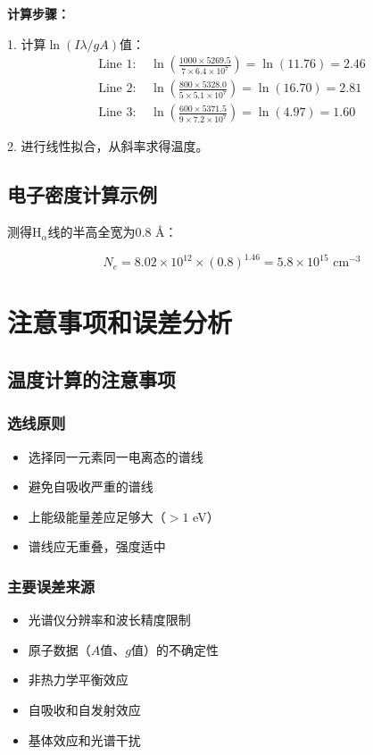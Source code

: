 \documentclass[12pt,a4paper]{article}
\begin{document}
\textbf{计算步骤：}

1. 计算$\ln(I\lambda/gA)$值：
   \begin{align}
   \text{Line 1: } &\ln\left(\frac{1000 \times 5269.5}{7 \times 6.4 \times 10^7}\right) = \ln(11.76) = 2.46 \\
   \text{Line 2: } &\ln\left(\frac{800 \times 5328.0}{5 \times 5.1 \times 10^7}\right) = \ln(16.70) = 2.81 \\
   \text{Line 3: } &\ln\left(\frac{600 \times 5371.5}{9 \times 7.2 \times 10^7}\right) = \ln(4.97) = 1.60
   \end{align}

2. 进行线性拟合，从斜率求得温度。

\subsection{电子密度计算示例}

测得H$_\alpha$线的半高全宽为0.8 Å：

\begin{equation}
N_e = 8.02 \times 10^{12} \times (0.8)^{1.46} = 5.8 \times 10^{15} \text{ cm}^{-3}
\end{equation}

\section{注意事项和误差分析}

\subsection{温度计算的注意事项}

\subsubsection{选线原则}
\begin{itemize}
    \item 选择同一元素同一电离态的谱线
    \item 避免自吸收严重的谱线
    \item 上能级能量差应足够大（$> 1$ eV）
    \item 谱线应无重叠，强度适中
\end{itemize}

\subsubsection{主要误差来源}
\begin{itemize}
    \item 光谱仪分辨率和波长精度限制
    \item 原子数据（$A$值、$g$值）的不确定性
    \item 非热力学平衡效应
    \item 自吸收和自发射效应
    \item 基体效应和光谱干扰
\end{itemize}
\end{document}
